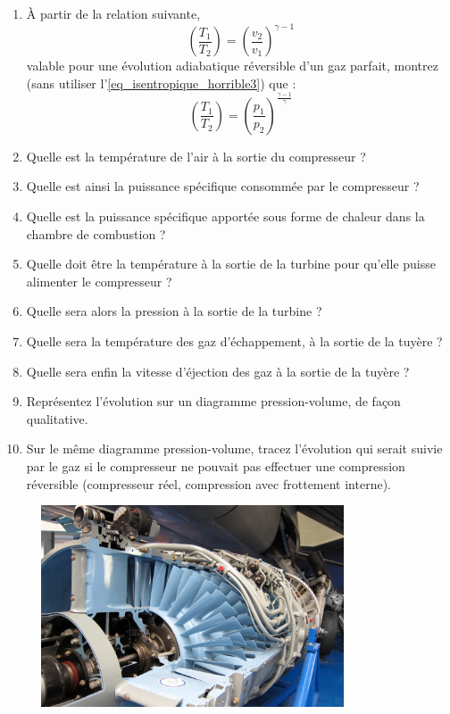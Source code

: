 	\begin{enumerate}
		\item À partir de la relation suivante,
			\begin{equation*}
				\left( \frac{T_1}{T_2} \right)	= \left( \frac{v_2}{v_1} \right)^{\gamma -1}
			\end{equation*}
			valable pour une évolution adiabatique réversible d’un gaz parfait, montrez (sans utiliser l’\cref{eq_isentropique_horrible3}) que :			
			\begin{equation*}
				\left( \frac{T_1}{T_2} \right)	=  \left( \frac{p_1}{p_2} \right)^{\frac{\gamma -1}{\gamma}}
			\end{equation*}
		\item Quelle est la température de l’air à la sortie du compresseur ?
		\item Quelle est ainsi la puissance spécifique consommée par le compresseur ?
		\item Quelle est la puissance spécifique apportée sous forme de chaleur dans la chambre de combustion ?
		\item Quelle doit être la température à la sortie de la turbine pour qu’elle puisse alimenter le compresseur ?
		\item Quelle sera alors la pression à la sortie de la turbine ?
		\item Quelle sera la température des gaz d’échappement, à la sortie de la tuyère ?
		\item Quelle sera enfin la vitesse d’éjection des gaz à la sortie de la tuyère ?
		\item Représentez l’évolution sur un diagramme pression-volume, de façon qualitative.
		\item Sur le même diagramme pression-volume, tracez l’évolution qui serait suivie par le gaz si le compresseur ne pouvait pas effectuer une compression réversible (compresseur réel, compression avec frottement interne).
	\end{enumerate}

	
	\begin{figure}
		\begin{center}
			\includegraphics[width=0.8\textwidth]{images/atar_compressor.jpg}
		\end{center}
		\label{fig_exo_compresseur_turbojet}
	\end{figure}


